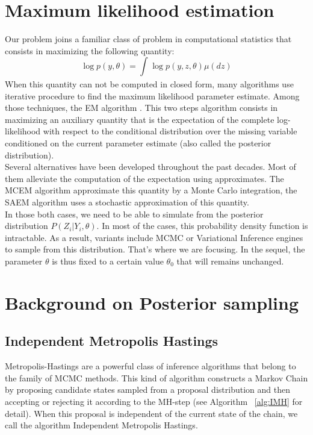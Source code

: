 \documentclass{article}
\begin{document}

\section{Maximum likelihood estimation}
Our problem joins a familiar class of problem in computational statistics that consists in maximizing the following quantity:
\begin{equation}
\log p(y,\theta) = \int_{}{\log p(y,z,\theta)\mu(dz)}
\end{equation}
When this quantity can not be computed in closed form, many algorithms use iterative procedure to find the maximum likelihood parameter estimate. Among those techniques, the EM algorithm \citep{dempster}. This two steps algorithm consists in maximizing an auxiliary quantity that is the expectation of the complete log-likelihood with respect to the conditional distribution over the missing variable conditioned on the current parameter estimate (also called the posterior distribution).\\
Several alternatives have been developed throughout the past decades. Most of them alleviate the computation of the expectation using approximates. The MCEM algorithm \citep{diebolt} approximate this quantity by a Monte Carlo integration, the SAEM algorithm \citep{lavielle} uses a stochastic approximation of this quantity.\\

In those both cases, we need to be able to simulate from the posterior distribution $P(Z_i|Y_i,\theta)$. In most of the cases, this probability density function is intractable. As a result, variants include MCMC or Variational Inference engines to sample from this distribution. That's where we are focusing. In the sequel, the parameter $\theta$ is thus fixed to a certain value $\theta_0$ that will remains unchanged.\\

\section{Background on Posterior sampling} 
 
\subsection{Independent Metropolis Hastings}
Metropolis-Hastings are a powerful class of inference algorithms that belong to the family of  MCMC methods. This kind of algorithm constructs a Markov Chain by proposing candidate states sampled from a proposal distribution and then accepting or rejecting it according to the MH-step (see Algorithm ~\ref{alg:IMH} for detail). When this proposal is independent of the current state of the chain, we call the algorithm Independent Metropolis Hastings.
\end{document}
